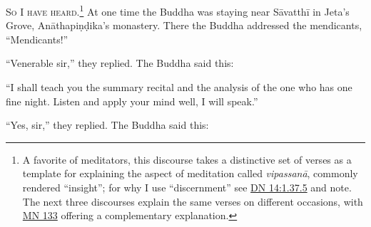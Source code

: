 \documentclass[12pt,openany]{book}%
\newcommand*{\scevam}[1]{\textsc{#1}}
\begin{document}
\scevam{So I have heard.\footnote{A favorite of meditators, this discourse takes a distinctive set of verses as a template for explaining the aspect of meditation called  \textit{\textsanskrit{vipassanā}}, commonly rendered “insight”; for why I use  “discernment” see \href{https://suttacentral.net/dn14/en/sujato\#1.37.5}{DN 14:1.37.5} and note. The next three discourses explain the same verses on different occasions, with \href{https://suttacentral.net/mn133/en/sujato}{MN 133} offering a complementary explanation. } }At one time the Buddha was staying near \textsanskrit{Sāvatthī} in Jeta’s Grove, \textsanskrit{Anāthapiṇḍika}’s monastery. There the Buddha addressed the mendicants, “Mendicants!” 

“Venerable sir,” they replied. The Buddha said this: 

“I shall teach you the summary recital and the analysis of the one who has one fine night. Listen and apply your mind well, I will speak.” 

“Yes, sir,” they replied. The Buddha said this: 
\end{document}
